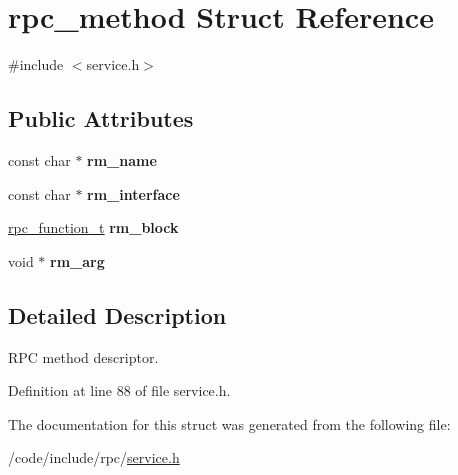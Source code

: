 \hypertarget{structrpc__method}{}\section{rpc\+\_\+method Struct Reference}
\label{structrpc__method}


{\ttfamily \#include $<$service.\+h$>$}

\subsection*{Public Attributes}
\begin{DoxyCompactItemize}
\item 
const char $\ast$ {\bfseries rm\+\_\+name}\hypertarget{structrpc__method_abeff7db58d8903e9e6827d4acac7a8a0}{}\label{structrpc__method_abeff7db58d8903e9e6827d4acac7a8a0}

\item 
const char $\ast$ {\bfseries rm\+\_\+interface}\hypertarget{structrpc__method_ad16d04d88d239e7412260ba948d88f7e}{}\label{structrpc__method_ad16d04d88d239e7412260ba948d88f7e}

\item 
\hyperlink{service_8h_a02d3dbd723de9bd5140887c9935ff05a}{rpc\+\_\+function\+\_\+t} {\bfseries rm\+\_\+block}\hypertarget{structrpc__method_ad6f2db7ebb8d4747730d4cb25b0c6824}{}\label{structrpc__method_ad6f2db7ebb8d4747730d4cb25b0c6824}

\item 
void $\ast$ {\bfseries rm\+\_\+arg}\hypertarget{structrpc__method_afc4708084618f0879e54efda3292cf8c}{}\label{structrpc__method_afc4708084618f0879e54efda3292cf8c}

\end{DoxyCompactItemize}


\subsection{Detailed Description}
R\+PC method descriptor. 

Definition at line 88 of file service.\+h.



The documentation for this struct was generated from the following file\+:\begin{DoxyCompactItemize}
\item 
/code/include/rpc/\hyperlink{service_8h}{service.\+h}\end{DoxyCompactItemize}
